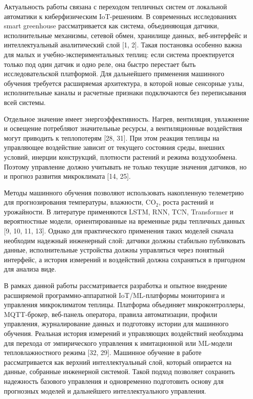 \documentclass[a4paper,14pt]{extarticle}
\begin{document}
Актуальность работы связана с переходом тепличных систем от локальной
автоматики к киберфизическим IoT-решениям. В современных исследованиях
smart greenhouse рассматривается как система, объединяющая датчики,
исполнительные механизмы, сетевой обмен, хранилище данных, веб-интерфейс
и интеллектуальный аналитический слой {[}1, 2{]}. Такая постановка
особенно важна для малых и учебно-экспериментальных теплиц: если система
проектируется только под один датчик и одно реле, она быстро перестает
быть исследовательской платформой. Для дальнейшего применения машинного
обучения требуется расширяемая архитектура, в которой новые сенсорные
узлы, исполнительные каналы и расчетные признаки подключаются без
переписывания всей системы.

Отдельное значение имеет энергоэффективность. Нагрев, вентиляция,
увлажнение и освещение потребляют значительные ресурсы, а вентиляционные
воздействия могут приводить к теплопотерям {[}28, 31{]}. При этом
реакция теплицы на управляющее воздействие зависит от текущего состояния
среды, внешних условий, инерции конструкций, плотности растений и режима
воздухообмена. Поэтому управление должно учитывать не только текущие
значения датчиков, но и прогноз развития микроклимата {[}14, 25{]}.

Методы машинного обучения позволяют использовать накопленную телеметрию
для прогнозирования температуры, влажности, CO\(_2\), роста растений и
урожайности. В литературе применяются LSTM, RNN, TCN, Transformer и
вероятностные модели, ориентированные на временные ряды тепличных данных
{[}9, 10, 11, 13{]}. Однако для практического применения таких моделей
сначала необходим надежный инженерный слой: датчики должны стабильно
публиковать данные, исполнительные устройства должны управляться через
понятный интерфейс, а история измерений и воздействий должна сохраняться
в пригодном для анализа виде.

В рамках данной работы рассматривается разработка и опытное внедрение
расширяемой программно-аппаратной IoT/ML-платформы мониторинга и
управления микроклиматом теплицы. Платформа объединяет микроконтроллеры,
MQTT-брокер, веб-панель оператора, правила автоматизации, профили
управления, журналирование данных и подготовку истории для машинного
обучения. Реальная история измерений и управляющих воздействий
необходима для перехода от эмпирического управления к имитационной или
ML-модели тепловлажностного режима {[}32, 29{]}. Машинное обучение в
работе рассматривается как верхний интеллектуальный слой, который
опирается на данные, собранные инженерной системой. Такой подход
позволяет сохранить надежность базового управления и одновременно
подготовить основу для прогнозных моделей и дальнейшего
интеллектуального управления.
\end{document}

